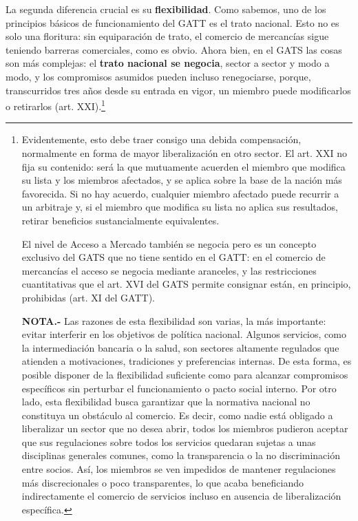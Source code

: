 \documentclass[10pt,a4paper]{article}
\begin{document}
La segunda diferencia crucial es su \textbf{flexibilidad}. Como sabemos, uno de los principios básicos de funcionamiento del GATT es el trato nacional. Esto no es solo una floritura: sin equiparación de trato, el comercio de mercancías sigue teniendo barreras comerciales, como es obvio. Ahora bien, en el GATS las cosas son más complejas: el \textbf{trato nacional se negocia}, sector a sector y modo a modo, y los compromisos asumidos pueden incluso renegociarse, porque, transcurridos tres años desde su entrada en vigor, un miembro puede modificarlos o retirarlos (art. XXI).\footnote{%
  Evidentemente, esto debe traer consigo una debida compensación, normalmente en forma de mayor liberalización en otro sector. El art. XXI no fija su contenido: será la que mutuamente acuerden el miembro que modifica su lista y los miembros afectados, y se aplica sobre la base de la nación más favorecida. Si no hay acuerdo, cualquier miembro afectado puede recurrir a un arbitraje y, si el miembro que modifica su lista no aplica sus resultados, retirar beneficios sustancialmente equivalentes.

  El nivel de Acceso a Mercado también se negocia pero es un concepto exclusivo del GATS que no tiene sentido en el GATT: en el comercio de mercancías el acceso se negocia mediante aranceles, y las restricciones cuantitativas que el art. XVI del GATS permite consignar están, en principio, prohibidas (art. XI del GATT).

  \textbf{NOTA.-} Las razones de esta flexibilidad son varias, la más importante: evitar interferir en los objetivos de política nacional. Algunos servicios, como la intermediación bancaria o la salud, son sectores altamente regulados que atienden a motivaciones, tradiciones y preferencias internas. De esta forma, es posible disponer de la flexibilidad suficiente como para alcanzar compromisos específicos sin perturbar el funcionamiento o pacto social interno. Por otro lado, esta flexibilidad busca garantizar que la normativa nacional no constituya un obstáculo al comercio. Es decir, como nadie está obligado a liberalizar un sector que no desea abrir, todos los miembros pudieron aceptar que sus regulaciones sobre todos los servicios quedaran sujetas a unas disciplinas generales comunes, como la transparencia o la no discriminación entre socios. Así, los miembros se ven impedidos de mantener regulaciones más discrecionales o poco transparentes, lo que acaba beneficiando indirectamente el comercio de servicios incluso en ausencia de liberalización específica.
}
\end{document}
